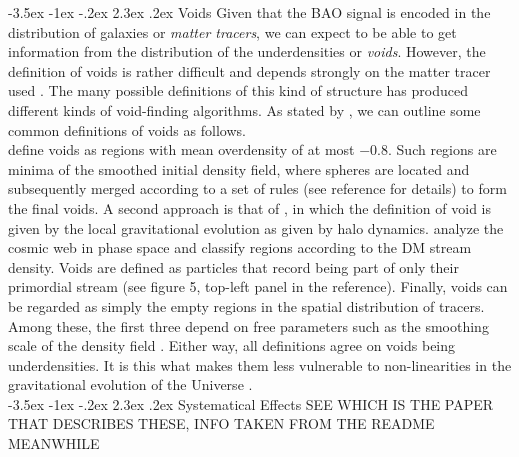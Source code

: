 \documentclass[a4paper,12pt,twoside]{article}
\makeatletter
\renewcommand{\subsection}{\@startsection {subsection}{1}{\z@}%
             {-3.5ex \@plus -1ex \@minus -.2ex}%
             {2.3ex \@plus.2ex}%
             {\normalfont\normalsize\bfseries}}
\makeatother
\begin{document}
\subsection{Voids\label{sec:voids}}
Given that the BAO signal is encoded in the distribution of galaxies or \textit{matter tracers}, we can expect to be able to get information from the distribution of the underdensities or \textit{voids}. However, the definition of voids is rather difficult and depends strongly on the matter tracer used \citep{VandeWeygaert2009}. The many possible definitions of this kind of structure has produced different kinds of void-finding algorithms. As stated by \textcite{Zhao2016}, we can outline some common definitions of voids as follows.\\ \textcite{Colberg2005} define voids as regions with mean overdensity of at most $-0.8$. Such regions are minima of the smoothed initial density field, where spheres are located and subsequently merged according to a set of rules (see reference for details) to form the final voids. A second approach is that of \textcite{Hahn2007, Forero-Romero2009}, in which the definition of void is given by the local gravitational evolution as given by halo dynamics. \textcite{Abel2012} analyze the cosmic web in phase space and classify regions according to the DM stream density. Voids are defined as particles that record being part of only their primordial stream (see figure 5, top-left panel in the reference). Finally, voids can be regarded as simply the empty regions in the spatial distribution of tracers. Among these, the first three depend on free parameters such as the smoothing scale of the density field \citep{Hahn2007}. Either way, all definitions agree on voids being underdensities. It is this what makes them less vulnerable to non-linearities in the gravitational evolution of the Universe \citep{VandeWeygaert2009, Zhao2016}. \\
\subsection{Systematical Effects}
\color{red}SEE WHICH IS THE PAPER THAT DESCRIBES THESE, INFO TAKEN FROM THE README MEANWHILE\color{black}
\end{document}
